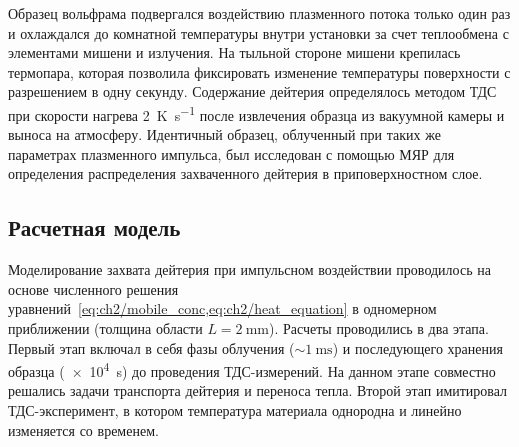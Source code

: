 Образец вольфрама подвергался воздействию плазменного потока только один раз и охлаждался до комнатной температуры внутри установки за счет теплообмена с элементами мишени и излучения. На тыльной стороне мишени крепилась термопара, которая позволила фиксировать изменение температуры поверхности с разрешением в одну секунду. Содержание дейтерия определялось методом ТДС при скорости нагрева \SI{2}{\kelvin\per\second} после извлечения образца из вакуумной камеры и выноса на атмосферу. Идентичный образец, облученный при таких же параметрах плазменного импульса, был исследован с помощью МЯР для определения распределения захваченного дейтерия в приповерхностном слое.

\subsection{Расчетная модель}\label{sec:ch3/sec1/subsec2}
Моделирование захвата дейтерия при импульсном воздействии проводилось на основе численного решения уравнений~\cref{eq:ch2/mobile_conc,eq:ch2/heat_equation} в одномерном приближении (толщина области \( L=\SI{2}{\milli\meter} \)). Расчеты проводились в два этапа. Первый этап включал в себя фазы облучения (\(\sim \SI{1}{\milli\second}\)) и последующего хранения образца (\SI{e4}{\second}) до проведения ТДС-измерений. На данном этапе совместно решались задачи транспорта дейтерия и переноса тепла. Второй этап имитировал ТДС-эксперимент, в котором температура материала однородна и линейно изменяется со временем.

